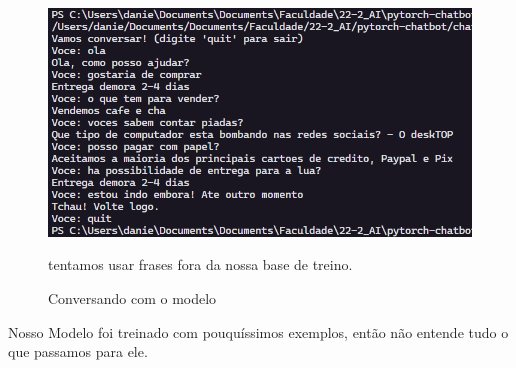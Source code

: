 \begin{figure}[H]
   \begin{center}
      \includegraphics[width=16cm]{img/chatting.png}
      \caption{Conversando com o modelo} \label{running}
      \medskip
      \small
      tentamos usar frases fora da nossa base de treino.
   \end{center}
\end{figure}

Nosso Modelo foi treinado com pouquíssimos exemplos, então não entende tudo o que passamos para ele.
